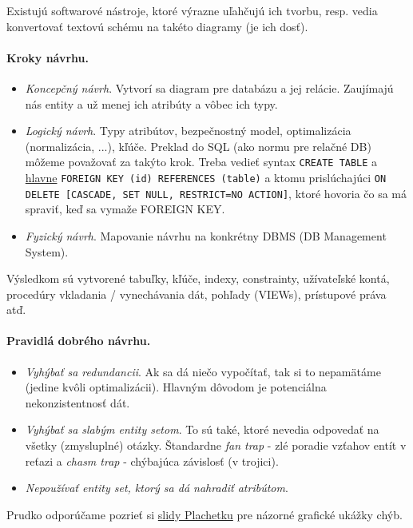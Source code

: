 \documentclass[10pt,a4paper]{article}
\begin{document}
Existujú softwarové nástroje, ktoré výrazne uľahčujú ich tvorbu, resp. vedia konvertovať textovú schému na takéto diagramy (je ich dosť). 

\paragraph{Kroky návrhu.}
\begin{itemize}
\item \emph{Koncepčný návrh}. Vytvorí sa diagram pre databázu a jej relácie. Zaujímajú nás entity a už menej ich atribúty a vôbec ich typy. 
\item \emph{Logický návrh}. Typy atribútov, bezpečnostný model,
optimalizácia (normalizácia, ...), kľúče. Preklad do SQL (ako normu pre
relačné DB) môžeme považovať za takýto krok. Treba vedieť syntax
\verb|CREATE TABLE| a
\href{http://dev.mysql.com/doc/refman/5.5/en/innodb-foreign-key-constraints.html}{hlavne}
{\tt FOREIGN KEY (id) REFERENCES (table)} a ktomu prislúchajúci {\tt ON
DELETE [CASCADE, SET NULL, RESTRICT=NO ACTION]}, ktoré hovoria čo sa má spraviť, keď sa vymaže FOREIGN KEY. 
\item \emph{Fyzický návrh}. Mapovanie návrhu na konkrétny DBMS (DB Management System). 
\end{itemize}

Výsledkom sú vytvorené tabuľky, kľúče, indexy, constrainty, užívateľské kontá,
procedúry vkladania / vynechávania dát, pohľady (VIEWs), prístupové práva atď.

\paragraph{Pravidlá dobrého návrhu.}
\begin{itemize}
\item \emph{Vyhýbať sa redundancii}. Ak sa dá niečo vypočítať, tak si to nepamätáme (jedine kvôli optimalizácii). Hlavným dôvodom je potenciálna nekonzistentnosť dát.  
\item \emph{Vyhýbať sa slabým entity setom}. To sú také, ktoré nevedia odpovedať na všetky (zmysluplné) otázky. Štandardne \emph{fan trap} - zlé poradie vzťahov entít v reťazi  a \emph{chasm trap} - chýbajúca závislosť (v trojici).
\item \emph{Nepoužívať entity set, ktorý sa dá nahradiť atribútom}. 
\end{itemize}

Prudko odporúčame pozrieť si
\href{http://www.dcs.fmph.uniba.sk/~plachetk/TEACHING/DB2011/db2011_6.pdf}{slidy Plachetku} pre názorné grafické ukážky chýb. 
\end{document}
